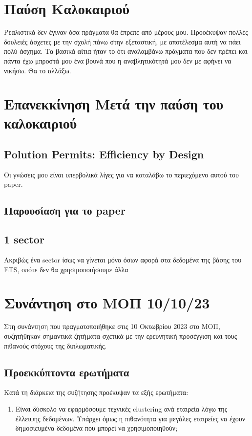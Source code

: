 \documentclass[a4paper,twoside,10pt]{article}
\begin{document}
\section{Παύση Καλοκαιριού}
Ρεαλιστικά δεν έγιναν όσα πράγματα θα έπρεπε από μέρους μου. Προοέκυψαν πολλές δουλειές άσχετες με την σχολή πάνω στην εξεταστική, με αποτέλεσμα αυτή να πάει πολύ άσχημα. Τα βασικά αίτια ήταν το ότι αναλαμβάνω πράγματα που δεν πρέπει και πάντα έχω μπροστά μου ένα βουνά που η αναβλητικότητά μου δεν με αφήνει να νικήσω. Θα το αλλάξω. 

\section{Επανεκκίνηση Μετά την παύση του καλοκαιριού}



\subsection{Polution Permits: Efficiency by Design}
Οι γνώσεις μου είναι υπερβολικά λίγες για να καταλάβω το περιεχόμενο αυτού του paper.

\subsection{Παρουσίαση για το paper}

	
  
\subsection{1 sector}
Ακριβώς ένα sector ίσως να γίνεται μόνο όσων αφορά στα δεδομένα της βάσης του ETS, οπότε δεν θα χρησιμοποιήσουμε άλλα 
	
\section{Συνάντηση στο ΜΟΠ 10/10/23}
Στη συνάντηση που πραγματοποιήθηκε στις 10 Οκτωβρίου 2023 στο ΜΟΠ, συζητήθηκαν σημαντικά ζητήματα σχετικά με την ερευνητική προσέγγιση και τους πιθανούς στόχους της διπλωματικής.

\subsection{Προεκκύπτοντα ερωτήματα}
Κατά τη διάρκεια της συζήτησης προέκυψαν τα εξής ερωτήματα:

\begin{enumerate}
	\item Είναι δύσκολο να εφαρμόσουμε τεχνικές clustering ανά εταιρεία λόγω της έλλειψης δεδομένων. Υπάρχει όμως η πιθανότητα για μεγάλες εταιρείες να έχουν δημοσιευμένα δεδομένα που μπορεί να χρησιμοποιηθούν;
\end{enumerate}
\end{document}
